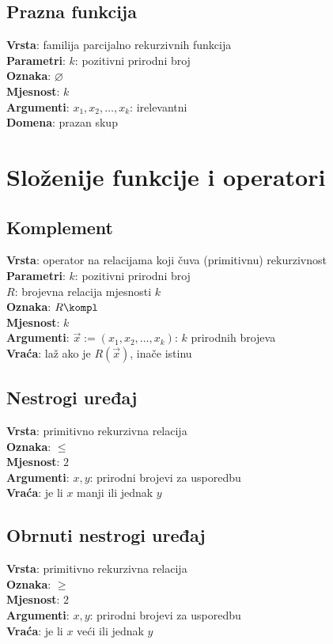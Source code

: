 \subsection{Prazna funkcija}
\textbf{Vrsta}: familija parcijalno rekurzivnih funkcija\\
\textbf{Parametri}: $k$: pozitivni prirodni broj\\
\textbf{Oznaka}: $\varnothing$\\
\textbf{Mjesnost}: $k$\\
\textbf{Argumenti}: $x_1,x_2,\dots,x_k$: irelevantni\\
\textbf{Domena}: prazan skup

\section{Složenije funkcije i operatori}

\subsection{Komplement}
\textbf{Vrsta}: operator na relacijama koji čuva (primitivnu) rekurzivnost\\
\textbf{Parametri}: $k$: pozitivni prirodni broj\\
$R$: brojevna relacija mjesnosti $k$\\
\textbf{Oznaka}: $R\kompl$\\
\textbf{Mjesnost}: $k$\\
\textbf{Argumenti}: $\vec x:=(x_1,x_2,\dots,x_k)$: $k$ prirodnih brojeva\\
\textbf{Vraća}: laž ako je $R(\vec x)$, inače istinu

\subsection{Nestrogi uređaj}
\textbf{Vrsta}: primitivno rekurzivna relacija\\
\textbf{Oznaka}: $\le$\\
\textbf{Mjesnost}: $2$\\
\textbf{Argumenti}: $x,y$: prirodni brojevi za usporedbu\\
\textbf{Vraća}: je li $x$ manji ili jednak $y$

\subsection{Obrnuti nestrogi uređaj}
\textbf{Vrsta}: primitivno rekurzivna relacija\\
\textbf{Oznaka}: $\ge$\\
\textbf{Mjesnost}: $2$\\
\textbf{Argumenti}: $x,y$: prirodni brojevi za usporedbu\\
\textbf{Vraća}: je li $x$ veći ili jednak $y$


